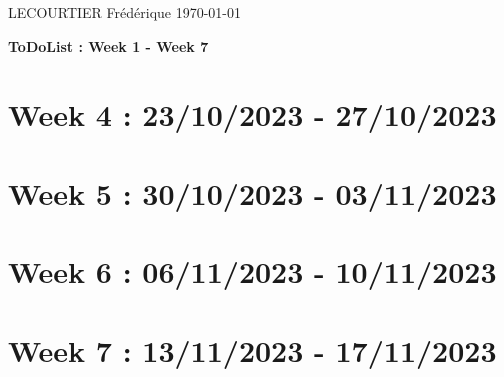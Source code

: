\documentclass{article}
\begin{document}
	LECOURTIER Frédérique \hfill \today
	\begin{center}
		\Large\textbf{{ToDoList : Week 1 - Week 7}}
	\end{center}
	\tableofcontents

	\newpage

	\section*{Week 4 : 23/10/2023 - 27/10/2023}
	

	\newpage

	\section*{Week 5 : 30/10/2023 - 03/11/2023}
	

	\newpage

	\section*{Week 6 : 06/11/2023 - 10/11/2023}
	

	\newpage

	\section*{Week 7 : 13/11/2023 - 17/11/2023}
	
\end{document}
